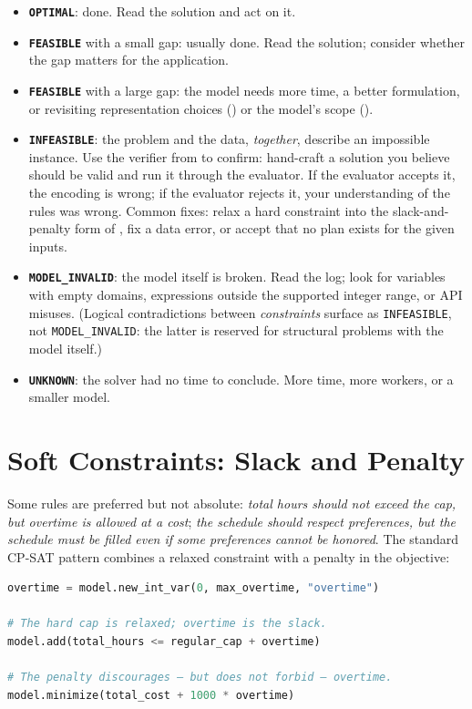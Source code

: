 \begin{itemize}
\item
  \textbf{\lstinline!OPTIMAL!}: done. Read the solution
  and act on it.
\item
  \textbf{\lstinline!FEASIBLE!} with a small gap:
  usually done. Read the solution; consider whether the gap matters for
  the application.
\item
  \textbf{\lstinline!FEASIBLE!} with a large gap: the
  model needs more time, a better formulation, or revisiting
  representation choices () or the model's scope ().
\item
  \textbf{\lstinline!INFEASIBLE!}: the problem and the
  data, \emph{together}, describe an impossible instance. Use the
  verifier from  to confirm: hand-craft a solution you believe
  should be valid and run it through the evaluator. If the evaluator
  accepts it, the encoding is wrong; if the evaluator rejects it, your
  understanding of the rules was wrong. Common fixes: relax a hard
  constraint into the slack-and-penalty form of , fix a data error,
  or accept that no plan exists for the given inputs.
\item
  \textbf{\lstinline!MODEL_INVALID!}: the model itself
  is broken. Read the log; look for variables with empty domains,
  expressions outside the supported integer range, or API misuses.
  (Logical contradictions between \emph{constraints} surface as
  \lstinline!INFEASIBLE!, not
  \lstinline!MODEL_INVALID!: the latter is reserved
  for structural problems with the model itself.)
\item
  \textbf{\lstinline!UNKNOWN!}: the solver had no time
  to conclude. More time, more workers, or a smaller model.
\end{itemize}

\section{Soft Constraints: Slack and Penalty}\label{sec:8.5}

Some rules are preferred but not absolute: \emph{total hours should
not exceed the cap, but overtime is allowed at a cost}; \emph{the
schedule should respect preferences, but the schedule must be filled
even if some preferences cannot be honored}. The standard CP-SAT pattern
combines a relaxed constraint with a penalty in the objective:

\begin{lstlisting}[language=Python]
overtime = model.new_int_var(0, max_overtime, "overtime")

# The hard cap is relaxed; overtime is the slack.
model.add(total_hours <= regular_cap + overtime)

# The penalty discourages — but does not forbid — overtime.
model.minimize(total_cost + 1000 * overtime)
\end{lstlisting}

